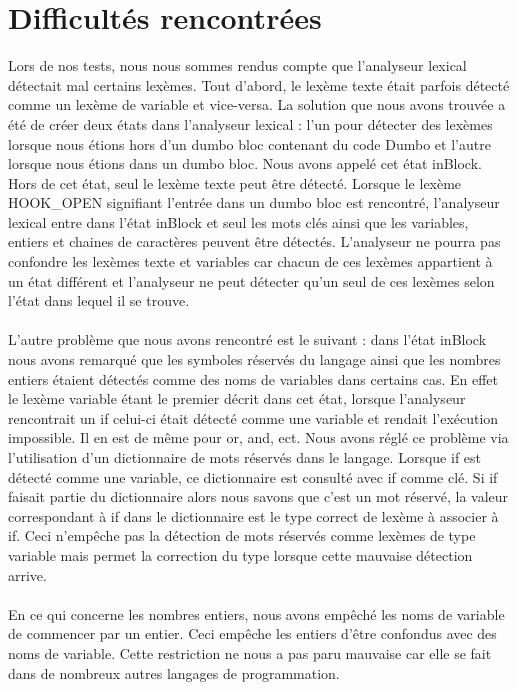 \documentclass[a4paper,10pt]{article}
\begin{document}
\section{Difficultés rencontrées}

Lors de nos tests, nous nous sommes rendus compte que l'analyseur lexical détectait mal certains lexèmes. Tout d'abord, le lexème texte était parfois détecté comme un lexème de variable
et vice-versa. La solution que nous avons trouvée a été de créer deux états dans l'analyseur lexical : l'un pour détecter des lexèmes lorsque nous étions hors d'un dumbo bloc 
contenant du code Dumbo et l'autre lorsque nous étions dans un dumbo bloc. Nous avons appelé cet état inBlock. Hors de cet état, seul le lexème texte peut être détecté. 
Lorsque le lexème HOOK\_OPEN signifiant l'entrée dans un dumbo bloc est rencontré, l'analyseur lexical entre dans l'état inBlock et seul les mots clés ainsi que les variables, entiers et 
chaines de caractères peuvent être détectés. L'analyseur ne pourra pas confondre les lexèmes texte et variables car chacun de ces lexèmes appartient à un état différent et l'analyseur 
ne peut détecter qu'un seul de ces lexèmes selon l'état dans lequel il se trouve. \\ \\
L'autre problème que nous avons rencontré est le suivant : dans l'état inBlock nous avons remarqué que les symboles réservés du langage ainsi que les nombres entiers 
étaient détectés comme des noms de variables dans certains cas. En effet le lexème variable étant le premier décrit dans cet état, lorsque l'analyseur rencontrait un \textrm{if} celui-ci 
était détecté comme une variable et rendait l'exécution impossible. Il en est de même pour \textrm{or}, \textrm{and}, ect. Nous avons réglé ce problème via l'utilisation d'un dictionnaire
de mots réservés dans le langage. Lorsque \textrm{if} est détecté comme une variable, ce dictionnaire est consulté avec \textrm{if} comme clé. Si if faisait partie du dictionnaire 
alors nous savons que c'est un mot réservé, la valeur correspondant à \textrm{if} dans le dictionnaire est le type correct de lexème à associer à \textrm{if}. Ceci n'empêche pas la détection
de mots réservés comme lexèmes de type variable mais permet la correction du type lorsque cette mauvaise détection arrive.\\ \\
En ce qui concerne les nombres entiers, nous avons empêché les noms de variable de commencer par un entier. Ceci empêche les entiers d'être confondus avec des noms de variable. 
Cette restriction ne nous a pas paru mauvaise car elle se fait dans de nombreux autres langages de programmation.
\end{document}
